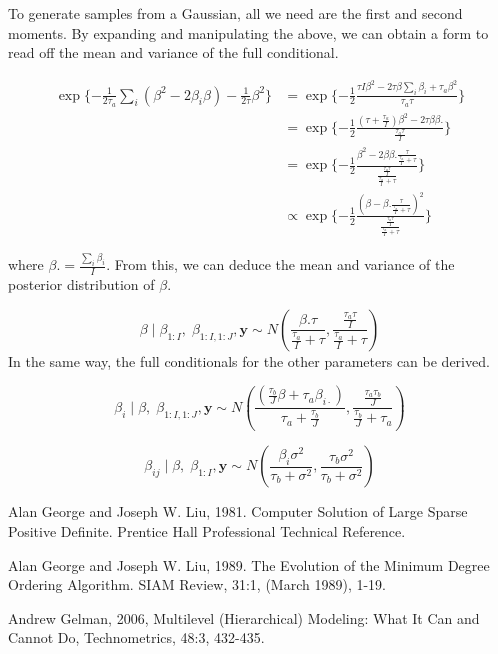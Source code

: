 \documentclass[]{article}
\begin{document}
To generate samples from a Gaussian, all we need are the first and
second moments. By expanding and manipulating the above, we can obtain a
form to read off the mean and variance of the full conditional.

\[
\begin{aligned}
\exp \{-\frac{1}{2\tau_a} \sum_i (\beta^2 -2\beta_i\beta) - \frac{1}{2\tau}\beta^2\} &= \exp \{-\frac{1}{2} \frac{\tau I \beta^2 - 2\tau\beta\sum_{i}\beta_i + \tau_a \beta^2}{\tau_a\tau}\} \\
&= \exp \{-\frac{1}{2} \frac{(\tau+ \frac{\tau_a}{I}) \beta^2 - 2\tau\beta \beta.} {\frac{\tau_a\tau}{I}}\}\\ 
&= \exp \{-\frac{1}{2} \frac{\beta^2 - 2\beta \beta. \frac{\tau}{\frac{\tau_a}{I}+\tau}} { \frac{\frac{\tau_a\tau }{I}} {\frac{\tau_a}{I}+\tau}}\}\\
&\propto \exp \{-\frac{1}{2} \frac{(\beta - \beta. \frac{\tau}{\frac{\tau_a}{I}+\tau})^2} { \frac{\frac{\tau_a\tau }{I}} {\frac{\tau_a}{I}+\tau}}\} 
\end{aligned}
\]

where \(\beta. = \frac{\sum_i\beta_i}{I}\). From this, we can deduce the
mean and variance of the posterior distribution of \(\beta\).

\[\beta \;|\; \beta_{1:I}, \;\beta_{1:I,1:J}, \boldsymbol{y} \sim N(\frac{\beta.\tau}{\frac{\tau_a}{I}+\tau}, \frac{\frac{\tau_a \tau}{I}}{\frac{\tau_a}{I}+\tau})\]
In the same way, the full conditionals for the other parameters can be
derived.

\[\beta_i \;|\; \beta, \;\beta_{1:I,1:J}, \boldsymbol{y} \sim N(\frac{(\frac{\tau_b}{J} \beta + \tau_a \beta_{i\cdot})}{\tau_a + \frac{\tau_b}{J}},  \frac{\frac{\tau_a\tau_b }{J}} {\frac{\tau_b}{J}+\tau_a})\]

\[\beta_{ij} \;|\; \beta, \;\beta_{1:I}, \boldsymbol{y} \sim N(\frac{\beta_i \sigma^2}{\tau_b + \sigma^2},  \frac{\tau_b \sigma^2}{\tau_b + \sigma^2})\]

\newpage

 \newline 

Alan George and Joseph W. Liu, 1981. Computer Solution of Large Sparse
Positive Definite. Prentice Hall Professional Technical Reference.

Alan George and Joseph W. Liu, 1989. The Evolution of the Minimum Degree
Ordering Algorithm. SIAM Review, 31:1, (March 1989), 1-19.

Andrew Gelman, 2006, Multilevel (Hierarchical) Modeling: What It Can and
Cannot Do, Technometrics, 48:3, 432-435.
\end{document}
